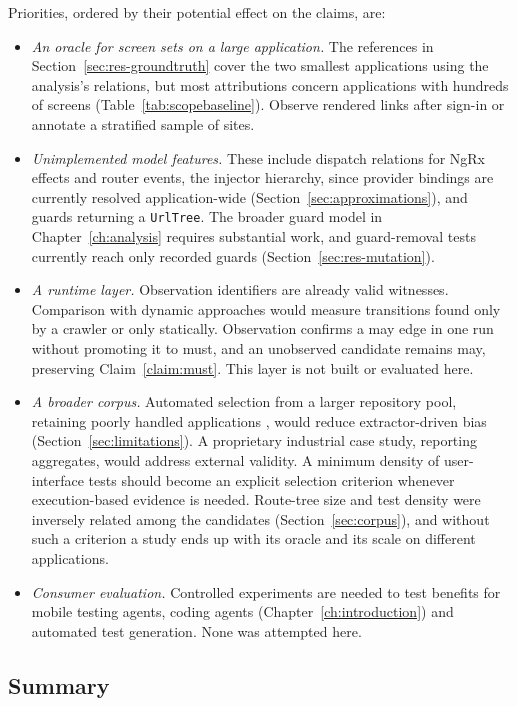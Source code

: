 Priorities, ordered by their potential effect on the claims, are:
\begin{itemize}
\item \emph{An oracle for screen sets on a large application.} The references in Section~\ref{sec:res-groundtruth} cover the two smallest applications using the analysis's relations, but most attributions concern applications with hundreds of screens (Table~\ref{tab:scopebaseline}). Observe rendered links after sign-in or annotate a stratified sample of sites.
\item \emph{Unimplemented model features.} These include dispatch relations for NgRx effects and router events, the injector hierarchy, since provider bindings are currently resolved application-wide (Section~\ref{sec:approximations}), and guards returning a \texttt{UrlTree}. The broader guard model in Chapter~\ref{ch:analysis} requires substantial work, and guard-removal tests currently reach only recorded guards (Section~\ref{sec:res-mutation}).
\item \emph{A runtime layer.} Observation identifiers are already valid witnesses. Comparison with dynamic approaches \cite{crawljax2012,feedex2013,fraggen2022} would measure transitions found only by a crawler or only statically. Observation confirms a may edge in one run without promoting it to must, and an unobserved candidate remains may, preserving Claim~\ref{claim:must}. This layer is not built or evaluated here.
\item \emph{A broader corpus.} Automated selection from a larger repository pool, retaining poorly handled applications \cite{kalliamvakou2014promises,kalliamvakou2016indepth}, would reduce extractor-driven bias (Section~\ref{sec:limitations}). A proprietary industrial case study, reporting aggregates, would address external validity. A minimum density of user-interface tests should become an explicit selection criterion whenever execution-based evidence is needed. Route-tree size and test density were inversely related among the candidates (Section~\ref{sec:corpus}), and without such a criterion a study ends up with its oracle and its scale on different applications.
\item \emph{Consumer evaluation.} Controlled experiments are needed to test benefits for mobile testing agents, coding agents (Chapter~\ref{ch:introduction}) and automated test generation. None was attempted here.
\end{itemize}

\subsection{Summary}

